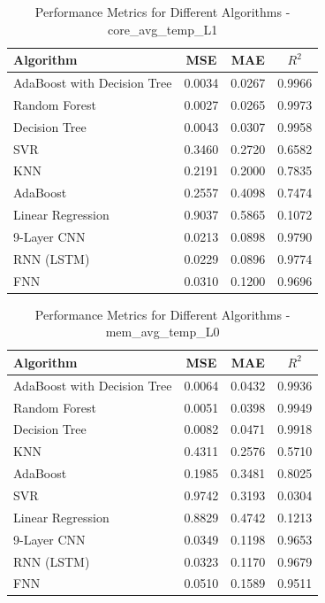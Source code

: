 \documentclass[conference]{IEEEtran}
\begin{document}
\begin{table}[htbp]
	\caption{Performance Metrics for Different Algorithms - core\_avg\_temp\_L1}
	\label{tab:core_avg_temp_L1}
	\begin{tabular}{lccc}
		\toprule
		\textbf{Algorithm} & \textbf{MSE} & \textbf{MAE} & \textbf{\(R^2\)} \\
		\midrule
		AdaBoost with Decision Tree & 0.0034 & 0.0267 & 0.9966 \\
		Random Forest & 0.0027 & 0.0265 & 0.9973 \\
		Decision Tree & 0.0043 & 0.0307 & 0.9958 \\
		SVR & 0.3460 & 0.2720 & 0.6582 \\
		KNN & 0.2191 & 0.2000 & 0.7835 \\
		AdaBoost & 0.2557 & 0.4098 & 0.7474 \\
		Linear Regression & 0.9037 & 0.5865 & 0.1072 \\
		9-Layer CNN                & 0.0213       & 0.0898       & 0.9790      \\ 
		RNN (LSTM)  & 0.0229       & 0.0896       & 0.9774      \\ 
		FNN                & 0.0310       & 0.1200       & 0.9696      \\ 
		\bottomrule
	\end{tabular}
\end{table}
\begin{table}[htbp]
	\caption{Performance Metrics for Different Algorithms - mem\_avg\_temp\_L0}
	\label{tab:mem_avg_temp_L0}
	\begin{tabular}{lccc}
		\toprule
		\textbf{Algorithm} & \textbf{MSE} & \textbf{MAE} & \textbf{\(R^2\)} \\
		\midrule
		AdaBoost with Decision Tree & 0.0064 & 0.0432 & 0.9936 \\
		Random Forest & 0.0051 & 0.0398 & 0.9949 \\
		Decision Tree & 0.0082 & 0.0471 & 0.9918 \\
		KNN & 0.4311 & 0.2576 & 0.5710 \\
		AdaBoost & 0.1985 & 0.3481 & 0.8025 \\
		SVR & 0.9742 & 0.3193 & 0.0304 \\
		Linear Regression & 0.8829 & 0.4742 & 0.1213 \\
		9-Layer CNN                & 0.0349       & 0.1198       & 0.9653      \\ 
		RNN (LSTM)  & 0.0323       & 0.1170       & 0.9679      \\ 
		FNN                & 0.0510       & 0.1589       & 0.9511      \\ 
		\bottomrule
	\end{tabular}
\end{table}
\end{document}
